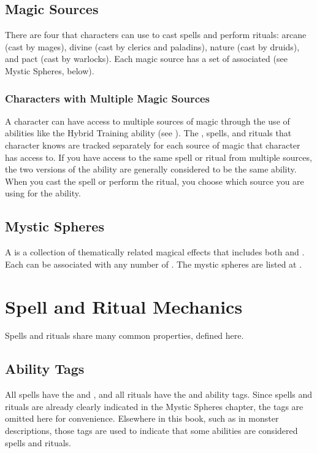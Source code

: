     \subsection{Magic Sources}
        There are four  that characters can use to cast spells and perform rituals: arcane (cast by mages), divine (cast by clerics and paladins), nature (cast by druids), and pact (cast by warlocks).
        Each magic source has a set of associated  (see Mystic Spheres, below).

        \subsubsection{Characters with Multiple Magic Sources}
            A character can have access to multiple sources of magic through the use of abilities like the Hybrid Training ability (see ).
            The , spells, and rituals that character knows are tracked separately for each source of magic that character has access to.
            If you have access to the same spell or ritual from multiple sources, the two versions of the ability are generally considered to be the same ability.
            When you cast the spell or perform the ritual, you choose which source you are using for the ability.

    \subsection{Mystic Spheres}
        A  is a collection of thematically related magical effects that includes both  and .
        Each  can be associated with any number of .
        The mystic spheres are listed at .

\section{Spell and Ritual Mechanics}\label{Spell and Ritual Mechanics}

    Spells and rituals share many common properties, defined here.

    \subsection{Ability Tags}
        All spells have the  and  , and all rituals have the  and  ability tags.
        Since spells and rituals are already clearly indicated in the Mystic Spheres chapter, the tags are omitted here for convenience.
        Elsewhere in this book, such as in monster descriptions, those tags are used to indicate that some abilities are considered spells and rituals.

